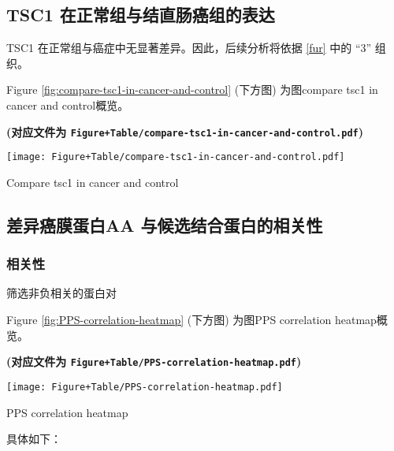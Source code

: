 \documentclass[
]{article}
\begin{document}
\hypertarget{tsc1-ux5728ux6b63ux5e38ux7ec4ux4e0eux7ed3ux76f4ux80a0ux764cux7ec4ux7684ux8868ux8fbe}{%
\subsection{TSC1 在正常组与结直肠癌组的表达}\label{tsc1-ux5728ux6b63ux5e38ux7ec4ux4e0eux7ed3ux76f4ux80a0ux764cux7ec4ux7684ux8868ux8fbe}}

TSC1 在正常组与癌症中无显著差异。因此，后续分析将依据 \ref{fur} 中的 ``3'' 组织。

Figure \ref{fig:compare-tsc1-in-cancer-and-control} (下方图) 为图compare tsc1 in cancer and control概览。

\textbf{(对应文件为 \texttt{Figure+Table/compare-tsc1-in-cancer-and-control.pdf})}

\def\@captype{figure}
\begin{center}
\texttt{[image: Figure+Table/compare-tsc1-in-cancer-and-control.pdf]}
\caption{Compare tsc1 in cancer and control}\label{fig:compare-tsc1-in-cancer-and-control}
\end{center}

\hypertarget{ux5deeux5f02ux764cux819cux86cbux767daa-ux4e0eux5019ux9009ux7ed3ux5408ux86cbux767dux7684ux76f8ux5173ux6027}{%
\subsection{差异癌膜蛋白AA 与候选结合蛋白的相关性}\label{ux5deeux5f02ux764cux819cux86cbux767daa-ux4e0eux5019ux9009ux7ed3ux5408ux86cbux767dux7684ux76f8ux5173ux6027}}

\hypertarget{ux76f8ux5173ux6027}{%
\subsubsection{相关性}\label{ux76f8ux5173ux6027}}

筛选非负相关的蛋白对

Figure \ref{fig:PPS-correlation-heatmap} (下方图) 为图PPS correlation heatmap概览。

\textbf{(对应文件为 \texttt{Figure+Table/PPS-correlation-heatmap.pdf})}

\def\@captype{figure}
\begin{center}
\texttt{[image: Figure+Table/PPS-correlation-heatmap.pdf]}
\caption{PPS correlation heatmap}\label{fig:PPS-correlation-heatmap}
\end{center}

具体如下：
\end{document}
